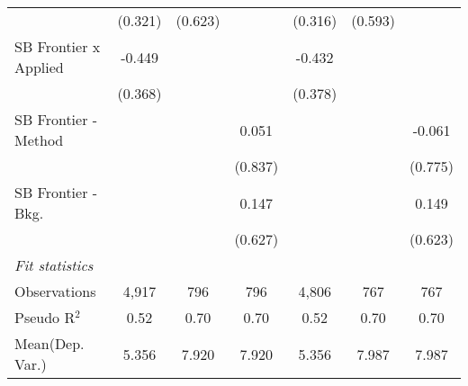 \begin{tabular}{lcccccc}
                                & (0.321)       & (0.623)      &              & (0.316)       & (0.593)      &   \\   
   SB Frontier x Applied        & -0.449        &              &              & -0.432        &              &   \\   
                                & (0.368)       &              &              & (0.378)       &              &   \\   
   SB Frontier - Method         &               &              & 0.051        &               &              & -0.061\\   
                                &               &              & (0.837)      &               &              & (0.775)\\   
   SB Frontier - Bkg.           &               &              & 0.147        &               &              & 0.149\\   
                                &               &              & (0.627)      &               &              & (0.623)\\   
   \midrule
   \emph{Fit statistics}\\
   Observations                 & 4,917         & 796          & 796          & 4,806         & 767          & 767\\  
   Pseudo R$^2$                 & 0.52          & 0.70         & 0.70         & 0.52          & 0.70         & 0.70\\  
Mean(Dep. Var.) & 5.356 & 7.920 & 7.920 & 5.356 & 7.987 & 7.987 \\
   

\end{tabular}
